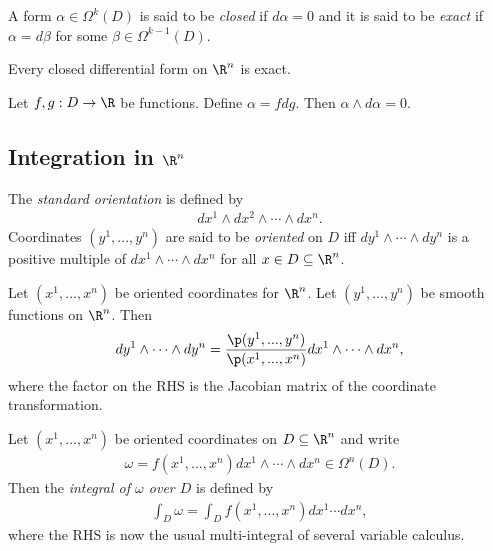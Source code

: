 \documentclass{article}
\begin{document}
\begin{definition}
    A form $\alpha\in\Omega^k(D)$ is said to be \emph{closed} if $d\alpha = 0$ and it is said
    to be \emph{exact} if $\alpha=d\beta$ for some $\beta\in\Omega^{k-1} (D)$.
\end{definition}

\begin{lemma}[Poincar\'e]
    Every closed differential form on $\R^n$ is exact.
\end{lemma}

\begin{lemma}
    Let $f,g:D\to\R$ be functions. Define $\alpha=fdg$. Then $\alpha\wedge d\alpha=0$. 
\end{lemma}

\subsection{Integration in $\R^n$}

\begin{definition}
    The \emph{standard orientation} is defined by
    \begin{align*}
        dx^1\wedge dx^2 \wedge \cdots \wedge dx^n.
    \end{align*}
    Coordinates $(y^1, ..., y^n)$ are said to be \emph{oriented} on $D$ iff
    $dy^1\wedge\cdots\wedge dy^n$ is a positive multiple of $dx^1\wedge\cdots\wedge dx^n$
    for all $x\in D\subseteq \R^n$.
\end{definition}

\begin{proposition}
    Let $(x^1,...,x^n)$ be oriented coordinates for $\R^n$. Let $(y^1, ..., y^n)$ be 
    smooth functions on $\R^n$. Then
    \begin{align*}
        dy^1\wedge\cdots\wedge dy^n = \frac{\p(y^1,...,y^n)}{\p(x^1,...,x^n)}dx^1\wedge\cdots\wedge dx^n,
    \end{align*}
    where the factor on the RHS is the Jacobian matrix of the coordinate transformation.
\end{proposition}

\begin{definition}
    Let $(x^1,...,x^n)$ be oriented coordinates on $D\subseteq \R^n$ and write 
    \begin{align*}
        \omega = f(x^1, ..., x^n)dx^1\wedge\cdots\wedge dx^n\in\Omega^n(D).
    \end{align*}
    Then the \emph{integral of $\omega$ over $D$} is defined by
    \begin{align*}
        \int_D \omega = \int_D f(x^1,...,x^n)dx^1\cdots dx^n,
    \end{align*}
    where the RHS is now the usual multi-integral of several variable calculus.
\end{definition}
\end{document}

